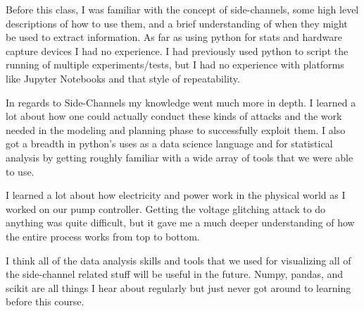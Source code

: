 




Before this class, I was familiar with the concept of side-channels, some high level descriptions of how to use them, and a brief understanding of when they might be used to extract information. As far as using python for stats and hardware capture devices I had no experience. I had previously used python to script the running of multiple experiments/tests, but I had no experience with platforms like Jupyter Notebooks and that style of repeatability. \\

\medskip


In regards to Side-Channels my knowledge went much more in depth. I learned a lot about how one could actually conduct these kinds of attacks and the work needed in the modeling and planning phase to successfully exploit them. I also got a breadth in python's uses as a data science language and for statistical analysis by getting roughly familiar with a wide array of tools that we were able to use. \\

\medskip


I learned a lot about how electricity and power work in the physical world as I worked on our pump controller. Getting the voltage glitching attack to do anything was quite difficult, but it gave me a much deeper understanding of how the entire process works from top to bottom. \\

\medskip


I think all of the data analysis skills and tools that we used for visualizing all of the side-channel related stuff will be useful in the future. Numpy, pandas, and scikit are all things I hear about regularly but just never got around to learning before this course. \\

